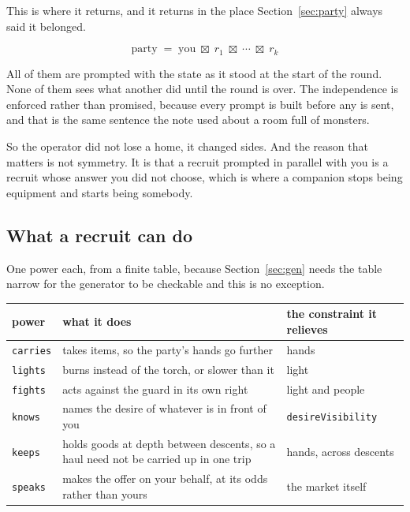 \documentclass[11pt,a4paper]{article}
\begin{document}
This is where it returns, and it returns in the place Section~\ref{sec:party} always said it
belonged.

\[ \text{party} \;=\; \text{you} \;\boxtimes\; r_1 \;\boxtimes\; \cdots \;\boxtimes\; r_k \]

All of them are prompted with the state as it stood at the start of the round. None of them sees
what another did until the round is over. The independence is enforced rather than promised,
because every prompt is built before any is sent, and that is the same sentence the note used
about a room full of monsters.

\begin{sectionbox}
So the operator did not lose a home, it changed sides. And the reason that matters is not
symmetry. It is that a recruit prompted in parallel with you is a recruit whose answer you did not
choose, which is where a companion stops being equipment and starts being somebody.
\end{sectionbox}

\subsection{What a recruit can do}

One power each, from a finite table, because Section~\ref{sec:gen} needs the table narrow for the
generator to be checkable and this is no exception.

\begin{center}
\begin{tabular}{@{}l@{\hspace{4mm}}>{\raggedright\arraybackslash}p{}@{\hspace{4mm}}>{\raggedright\arraybackslash}p{}@{}}
\toprule
\textbf{power} & \textbf{what it does} & \textbf{the constraint it relieves} \\
\midrule
\texttt{carries} & takes items, so the party's hands go further & hands \\[1mm]
\texttt{lights}  & burns instead of the torch, or slower than it & light \\[1mm]
\texttt{fights}  & acts against the guard in its own right & light and people \\[1mm]
\texttt{knows}   & names the desire of whatever is in front of you & \texttt{desireVisibility} \\[1mm]
\texttt{keeps}   & holds goods at depth between descents, so a haul need not be carried up in one trip & hands, across descents \\[1mm]
\texttt{speaks}  & makes the offer on your behalf, at its odds rather than yours & the market itself \\
\bottomrule
\end{tabular}
\end{center}
\end{document}
